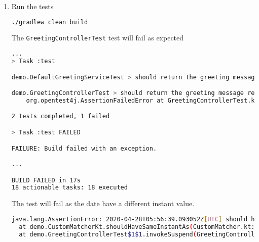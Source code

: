 \begin{enumerate}
\begin{lstlisting}[language=Kotlin]
@MicronautTest
class GreetingControllerTest(
  private val service: GreetingService,
  @Client("/greeting") private val client: RxHttpClient
) : StringSpec({
  "should return the greeting message returned by the greeting service" {
    val mock = getMock(service)

    val name = "Albert"
    val greeting = GreetResponse(
      message = "Hello $name, from Micronaut",
      time = ZonedDateTime.now()
    )
    every { mock.greet(name) } returns greeting

    val result = client.toBlocking().retrieve("/$name", GreetResponse::class.java)
    result.message shouldBe greeting.message
    result.time shouldHaveSameInstantAs greeting.time

    verify(exactly = 1) { mock.greet(name) }

    /* Invoked by Micronaut */
    verify(exactly = 2) { mock.hashCode() }
    confirmVerified(mock)
  }
}) {
  @MockBean(GreetingService::class)
  fun greetingService(): GreetingService =
    mockk()
}
\end{lstlisting}

\item Run the tests

\begin{lstlisting}[language=bash]
./gradlew clean build
\end{lstlisting}

The \texttt{GreetingControllerTest} test will fail as expected

\begin{lstlisting}[language=bash]
...
> Task :test

demo.DefaultGreetingServiceTest > should return the greeting message for the given name PASSED

demo.GreetingControllerTest > should return the greeting message returned by the greeting service FAILED
    org.opentest4j.AssertionFailedError at GreetingControllerTest.kt:34

2 tests completed, 1 failed

> Task :test FAILED

FAILURE: Build failed with an exception.

...

BUILD FAILED in 17s
18 actionable tasks: 18 executed
\end{lstlisting}

The test will fail as the date have a different instant value.

\begin{lstlisting}[language=bash]
java.lang.AssertionError: 2020-04-28T05:56:39.093052Z[UTC] should have same instance as 2020-04-28T07:56:38.680259+02:00[Europe/Berlin]
  at demo.CustomMatcherKt.shouldHaveSameInstantAs(CustomMatcher.kt:13)
  at demo.GreetingControllerTest$1$1.invokeSuspend(GreetingControllerTest.kt:33)
\end{lstlisting}


\end{enumerate}
